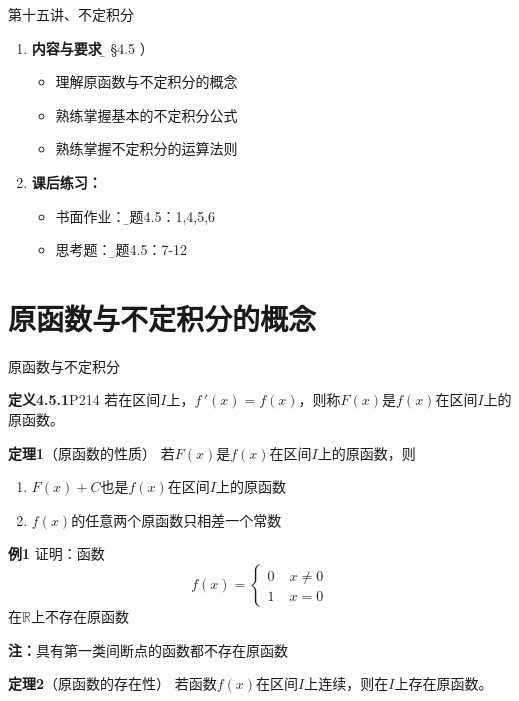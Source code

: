 \begin{frame}{第十五讲、不定积分}
	\linespread{1.5}
	\begin{enumerate}
	  \item {\bf 内容与要求}{\b（ \S 4.5 ）}
	  \begin{itemize}
	    \item 理解原函数与不定积分的概念
	    \item 熟练掌握基本的不定积分公式
	    \item 熟练掌握不定积分的运算法则
	  \vspace{1em}
	  \end{itemize}
	  \item {\bf 课后练习：}
	  \begin{itemize}
	    \item 书面作业：{\b 习题4.5：1,4,5,6}
 	    \item 思考题：{\b 习题4.5：7-12}
	  \end{itemize}
	\end{enumerate}
\end{frame}

\section{原函数与不定积分的概念}

\begin{frame}{原函数与不定积分}
	\linespread{1.4}
	\pause
	\begin{block}{{\bf 定义4.5.1}\hfill P214}
		若在区间$I$上，$f\,'(x)=f(x)$，则称$F(x)$是{\bb $f(x)$在区间$I$上的原函数}。
	\end{block}\pause \bigskip
	\begin{block}{\alert{{\bf 定理1}（原函数的性质）}}\pause
		若$F(x)$是$f(x)$在区间$I$上的原函数，则\pause
		\begin{enumerate}
		  \item $F(x)+C$也是$f(x)$在区间$I$上的原函数\pause
		  \item $f(x)$的任意两个原函数只相差一个常数
		\end{enumerate}
	\end{block}
\end{frame}

\begin{frame}
	\linespread{1.5}
	\begin{exampleblock}{\bf 例1}
		证明：函数$$f(x)=\left\{\begin{array}{ll}
		0\;& x\ne 0\\1\;& x=0
		\end{array}\right.$$在$\mathbb{R}$上不存在原函数
	\end{exampleblock}
	\pause
	{\bf 注：}\alert{具有第一类间断点的函数都不存在原函数}\pause
 	\bigskip
	\begin{block}{\alert{{\bf 定理2}（原函数的存在性）}}
		若函数$f(x)$在区间$I$上连续，则在$I$上存在原函数。
	\end{block}
\end{frame}

